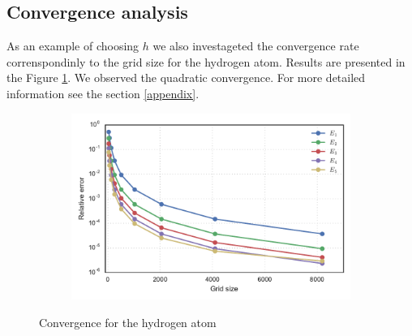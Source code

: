 \documentclass[a4paper, 11pt]{article}
\begin{document}
\subsection{Convergence analysis}
As an example of choosing $h$ we also investageted the convergence rate correnspondinly to the grid size for the hydrogen atom.  Results are presented in the Figure \ref{h2_grid}. We observed the quadratic convergence. For more detailed information see the section \ref{appendix}.
\begin{figure}[h!]
\centering
\begin{subfigure}{.5\textwidth}
  \centering
  \includegraphics[width=1.0\linewidth]{h2_grid.pdf}
\end{subfigure}
\caption{Convergence for the hydrogen atom}
\label{h2_grid}
\end{figure}
\end{document}
